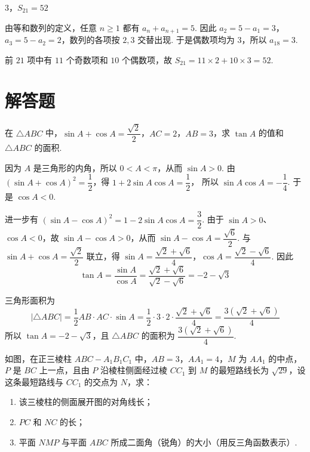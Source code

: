 \begin{answer}
\(3\)，\(S_{21}=52\)
\end{answer}

\begin{solution}
由等和数列的定义，任意 \(n\geqslant1\) 都有 \(a_n+a_{n+1}=5\).
因此 \(a_2=5-a_1=3\)，\(a_3=5-a_2=2\)，数列的各项按 \(2,3\) 交替出现. 于是偶数项均为 \(3\)，所以
\(a_{18}=3\).

前 \(21\) 项中有 \(11\) 个奇数项和 \(10\) 个偶数项，故
\(S_{21}=11\times2+10\times3=52\).
\end{solution}

\section{解答题}
\begin{problem}
在 \(\triangle ABC\) 中，\(\sin A+\cos A=\dfrac{\sqrt{2}}{2}\)，\(AC=2\)，\(AB=3\)，求 \(\tan A\) 的值和 \(\triangle ABC\) 的面积.
\end{problem}

\begin{solution}
因为 \(A\) 是三角形的内角，所以 \(0<A<\pi\)，从而 \(\sin A>0\). 由
\((\sin A+\cos A)^2=\dfrac12\)，得 \(1+2\sin A\cos A=\dfrac12\)，
所以 \(\sin A\cos A=-\dfrac14\). 于是 \(\cos A<0\).

进一步有 \((\sin A-\cos A)^2=1-2\sin A\cos A=\dfrac32\).
由于 \(\sin A>0\)、\(\cos A<0\)，故 \(\sin A-\cos A>0\)，从而
\(\sin A-\cos A=\dfrac{\sqrt6}{2}\). 与 \(\sin A+\cos A=\dfrac{\sqrt2}{2}\) 联立，得
\(\sin A=\dfrac{\sqrt2+\sqrt6}{4}\)，\(\cos A=\dfrac{\sqrt2-\sqrt6}{4}\).
因此
\[
\tan A=\frac{\sin A}{\cos A}
=\frac{\sqrt2+\sqrt6}{\sqrt2-\sqrt6}
=-2-\sqrt3
\]

三角形面积为
\[
\left|\triangle ABC\right|=\dfrac12 AB\cdot AC\cdot\sin A
=\dfrac12\cdot3\cdot2\cdot\dfrac{\sqrt2+\sqrt6}{4}
=\dfrac{3(\sqrt2+\sqrt6)}{4}
\]
所以 \(\tan A=-2-\sqrt3\)，且 \(\triangle ABC\) 的面积为 \(\dfrac{3(\sqrt2+\sqrt6)}4\).
\end{solution}

\begin{problem}
如图，在正三棱柱 \(ABC-A_1B_1C_1\) 中，\(AB=3\)，\(AA_1=4\)，\(M\) 为 \(AA_1\) 的中点，\(P\) 是 \(BC\) 上一点，且由 \(P\) 沿棱柱侧面经过棱 \(CC_1\) 到 \(M\) 的最短路线长为 \(\sqrt{29}\)，设这条最短路线与 \(CC_1\) 的交点为 \(N\)，求：

\begin{enumerate}
\item 该三棱柱的侧面展开图的对角线长；
\item \(PC\) 和 \(NC\) 的长；
\item 平面 \(NMP\) 与平面 \(ABC\) 所成二面角（锐角）的大小（用反三角函数表示）.
\end{enumerate}

\end{problem}

